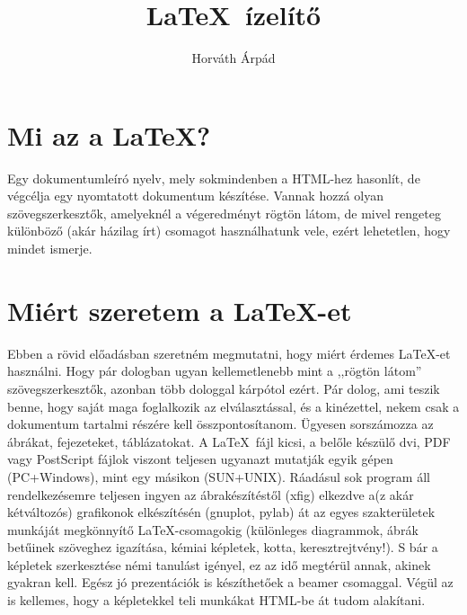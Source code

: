 \documentclass[12pt]{article}
\begin{document}
\title{\LaTeX\ ízelítő}
\author{Horváth Árpád}
\maketitle



\section{Mi az a \LaTeX?}
\parbox{0.45\textwidth}{Egy dokumentumleíró nyelv, mely sokmindenben a
HTML-hez hasonlít, de végcélja egy nyomtatott dokumentum készítése.
Vannak hozzá olyan szövegszerkesztők, amelyeknél a végeredményt rögtön
látom, de mivel rengeteg különböző (akár házilag írt) csomagot
használhatunk vele, ezért lehetetlen, hogy mindet ismerje.}
%



\newpage
\section{Miért szeretem a \LaTeX-et}
{\color{red}
\begin{center}
\heartpar
{ Ebben a rövid előadásban szeretném megmutatni, hogy miért érdemes \LaTeX-et
használni. Hogy pár dologban ugyan kellemetlenebb mint a ,,rögtön 
látom'' szövegszerkesztők, azonban több dologgal kárpótol ezért.
Pár dolog, ami teszik benne, hogy saját maga foglalkozik az elválasztással,
és a kinézettel,
nekem csak a dokumentum tartalmi részére kell összpontosítanom.
Ügyesen sorszámozza az ábrákat, fejezeteket, táblázatokat.
A \LaTeX\ fájl kicsi, a belőle készülő dvi, PDF vagy PostScript fájlok
viszont teljesen ugyanazt mutatják egyik gépen (PC+Windows), mint egy másikon
(SUN+UNIX). Ráadásul sok program áll rendelkezésemre teljesen ingyen az 
ábrakészítéstől (xfig) elkezdve a(z akár kétváltozós) grafikonok
elkészítésén (gnuplot, pylab) át az egyes szakterületek munkáját megkönnyítő
\LaTeX-csomagokig (különleges diagrammok, ábrák betűinek szöveghez
igazítása, kémiai képletek, kotta, keresztrejtvény!).
  S bár a képletek szerkesztése némi tanulást igényel, ez az idő
megtérül annak, akinek gyakran kell.
Egész jó prezentációk is készíthetőek a beamer csomaggal.
Végül az is kellemes, hogy a képletekkel teli
munkákat HTML-be át tudom alakítani. }%
\end{center}
}%
\end{document}
